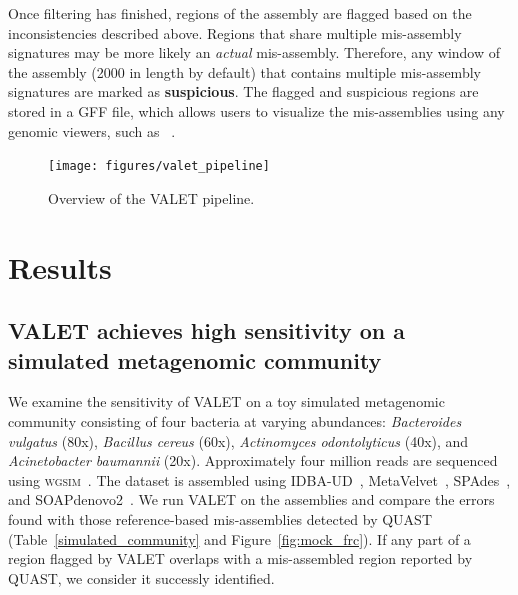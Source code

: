 \documentclass[12pt,\mydriver]{thesis}
\begin{document}
Once filtering has finished, regions of the assembly are flagged based on the inconsistencies described above.
Regions that share multiple mis-assembly signatures may be more likely an \textit{actual} mis-assembly.
Therefore, any window of the assembly (2000 in length by default) that contains multiple mis-assembly signatures are marked as \textbf{suspicious}.
The flagged and suspicious regions are stored in a \textsc{GFF} file, which allows users to visualize the mis-assemblies using any genomic viewers, such as ~\cite{thorvaldsdottir2012integrative}.

\begin{figure}[tb!]
\begin{center}
\texttt{[image: figures/valet\_pipeline]}
\end{center}
\renewcommand{\baselinestretch}{1}
\small\normalsize
\begin{quote}
\caption[Overview of the VALET pipeline]{Overview of the VALET pipeline.}
\label{fig:valet_pipeline}
\end{quote}
\end{figure}
\renewcommand{\baselinestretch}{2}
\small\normalsize


\section{Results}

\subsection{VALET achieves high sensitivity on a simulated metagenomic community}

We examine the sensitivity of VALET on a toy simulated metagenomic community consisting of four bacteria at varying abundances: \emph{Bacteroides vulgatus} (80x), \emph{Bacillus cereus} (60x), \emph{Actinomyces odontolyticus} (40x), and \emph{Acinetobacter baumannii} (20x).
Approximately four million reads are sequenced using \textsc{wgsim}~\cite{li2013wgsim}.
The dataset is assembled using IDBA-UD~\cite{peng2012idba}, MetaVelvet~\cite{namiki2012metavelvet}, SPAdes~\cite{bankevich2012spades}, and SOAPdenovo2~\cite{luo2012soapdenovo2}.
We run VALET on the assemblies and compare the errors found with those reference-based mis-assemblies detected by QUAST (Table~\ref{simulated_community} and Figure~\ref{fig:mock_frc}).
If any part of a region flagged by VALET overlaps with a mis-assembled region reported by QUAST, we consider it successly identified.
\end{document}

